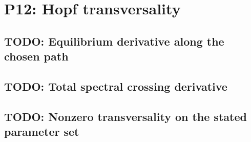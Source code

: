 
\section{P12: Hopf transversality}
\label{sec:P12}

\subsection{TODO: Equilibrium derivative along the chosen path}
\label{slot:P12-1}

\subsection{TODO: Total spectral crossing derivative}
\label{slot:P12-2}

\subsection{TODO: Nonzero transversality on the stated parameter set}
\label{slot:P12-3}

